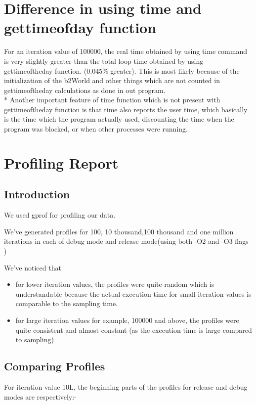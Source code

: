 \documentclass[11pt,english]{article}
\begin{document}
\section{
	Difference in using time and gettimeofday function}
For an iteration value of 100000, the real time obtained by using time command is very slightly greater than the total loop time obtained by using gettimeoftheday function. (0.045\% greater). This is most likely because of the initialization of the b2World and other things which are not counted in gettimeoftheday calculations as done in out program.
\\*
Another important feature of time function which is not present with gettimeoftheday function is that time also reports the user time, which basically is the time which the program actually used, discounting the time when the program was blocked, or when other processes were running.


\section{
Profiling Report }

\subsection{Introduction}

We used gprof for profiling our data.

We've generated profiles for 100, 10 thousand,100 thousand and
one million iterations in each of debug mode and release mode(using
both -O2 and -O3 flags )

We've noticed that 
\begin{itemize}
\item for lower iteration values, the profiles were quite random which is
understandable because the actual execution time for small iteration
values is comparable to the sampling time.
\item for large iteration values for example, 100000 and above, the profiles
were quite consistent and almost constant (as the execution time is large
compared to sampling)
\end{itemize}

\subsection{Comparing Profiles}

For iteration value 10L, the beginning parts of the profiles for release
and debug modes are respectively:-
\end{document}
